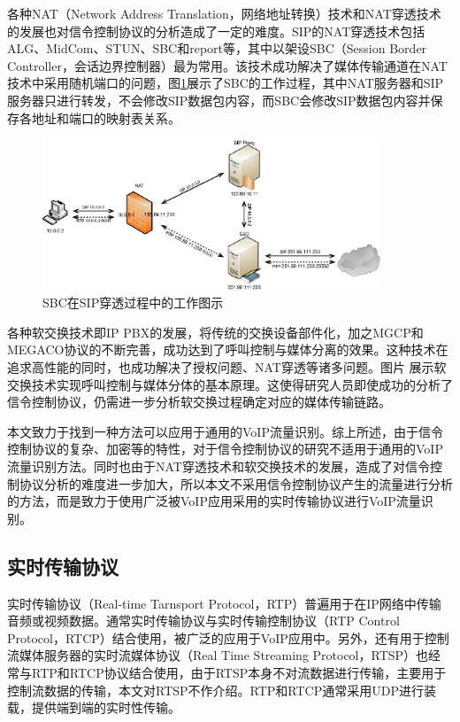 各种NAT（Network Address Translation，网络地址转换）技术和NAT穿透技术的发展也对信令控制协议的分析造成了一定的难度。SIP的NAT穿透技术包括ALG、MidCom、STUN、SBC和report等，其中以架设SBC（Session Border Controller，会话边界控制器）最为常用。该技术成功解决了媒体传输通道在NAT技术中采用随机端口的问题，图\ref{fig:sbc}展示了SBC的工作过程，其中NAT服务器和SIP服务器只进行转发，不会修改SIP数据包内容，而SBC会修改SIP数据包内容并保存各地址和端口的映射表关系。

\begin{figure}[thb]
\begin{center}
\includegraphics[width=0.9\textwidth]{figures/sbc.eps}
\caption{SBC在SIP穿透过程中的工作图示}\label{fig:sbc}
\end{center}
\end{figure}

各种软交换技术即IP PBX的发展，将传统的交换设备部件化，加之MGCP和MEGACO协议的不断完善，成功达到了呼叫控制与媒体分离的效果。这种技术在追求高性能的同时，也成功解决了授权问题、NAT穿透等诸多问题。图片 展示软交换技术实现呼叫控制与媒体分体的基本原理。这使得研究人员即使成功的分析了信令控制协议，仍需进一步分析软交换过程确定对应的媒体传输链路。

本文致力于找到一种方法可以应用于通用的VoIP流量识别。综上所述，由于信令控制协议的复杂、加密等的特性，对于信令控制协议的研究不适用于通用的VoIP流量识别方法。同时也由于NAT穿透技术和软交换技术的发展，造成了对信令控制协议分析的难度进一步加大，所以本文不采用信令控制协议产生的流量进行分析的方法，而是致力于使用广泛被VoIP应用采用的实时传输协议进行VoIP流量识别。

\subsection{实时传输协议}
实时传输协议（Real-time Tarnsport Protocol，RTP）普遍用于在IP网络中传输音频或视频数据。通常实时传输协议与实时传输控制协议（RTP Control Protocol，RTCP）结合使用，被广泛的应用于VoIP应用中。另外，还有用于控制流媒体服务器的实时流媒体协议（Real Time Streaming Protocol，RTSP）也经常与RTP和RTCP协议结合使用，由于RTSP本身不对流数据进行传输，主要用于控制流数据的传输，本文对RTSP不作介绍。RTP和RTCP通常采用UDP进行装载，提供端到端的实时性传输。

